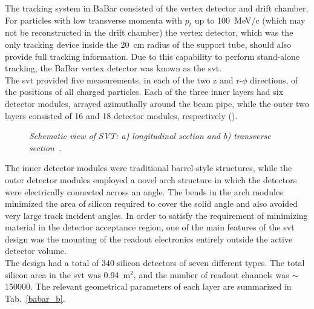 The tracking system in BaBar consisted of the vertex detector and drift
chamber. For particles with low transverse momenta with $p_t$ up to 100~MeV/c
(which may not be reconstructed in the drift chamber) the vertex detector, which
was the only tracking device inside the 20~cm radius of the support tube, should
also provide full tracking information. Due to this capability to perform
stand-alone
tracking, the BaBar vertex detector was known as the \gls{svt}.\\
The \gls{svt} provided five measurements, in each of the two z and r-$\phi$
directions, of the positions of all charged particles. Each of the three inner
layers had six detector modules, arrayed azimuthally around the beam pipe, while
the outer two layers consisted of 16 and 18 detector modules, respectively
().
\begin{figure}[!htbp]
  \centering {} 
  \caption{\textit{Schematic view of SVT: a) longitudinal section and b)
      transverse section~\cite{babar_status_2001}.}}\label{babar}
\end{figure}
The inner detector modules were traditional barrel-style structures, while the
outer detector modules employed a novel arch structure in which the detectors
were electrically connected across an angle. The bends in the arch modules
minimized the area of silicon required to cover the solid angle and also avoided
very large track incident angles. In order to satisfy the requirement of
minimizing material in the detector acceptance region, one of the main features
of the \gls{svt} design was the mounting of the readout electronics entirely
outside the active detector volume.\\
The design had a total of 340 silicon detectors of seven different types. The
total silicon area in the \gls{svt} was 0.94~m$^2$, and the number of readout
channels was $\sim$150000. The relevant geometrical parameters of each layer are
summarized in Tab.~\ref{babar_b}.
